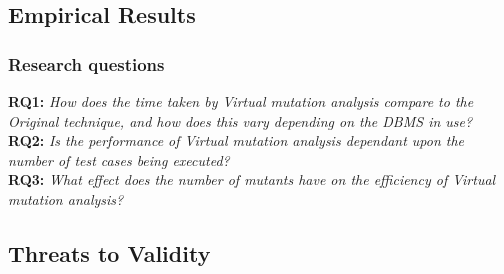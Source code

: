 	\subsection{Empirical Results}

		\subsubsection{Research questions}

			\textbf{RQ1: }\emph{How does the time taken by Virtual mutation analysis compare to the Original technique, and how does this vary depending on the DBMS in use?}\\


			\textbf{RQ2: }\emph{Is the performance of Virtual mutation analysis dependant upon the number of test cases being executed?}\\


			\textbf{RQ3: }\emph{What effect does the number of mutants have on the efficiency of Virtual mutation analysis?}\\


		\begin{table}[ht]
			\caption{\label{tbl:mean_time_mean_summary}
			The proportion of mean times taken for mutation analysis compared to Original technique, summarised as a mean across all schemas.
			}\vspace{1em}
			\scriptsize
			\centering
		\end{table}

	\subsection{Threats to Validity}

